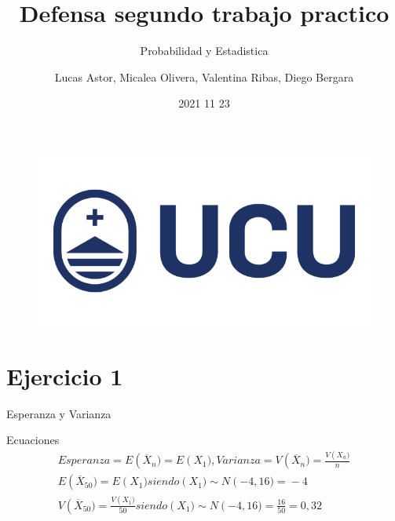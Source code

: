 \documentclass{beamer}
\author{Lucas Astor, Micalea Olivera, Valentina Ribas, Diego Bergara}
\title{Defensa segundo trabajo practico}
\subtitle{Probabilidad y Estadistica}
\institute{UNIVERSIDAD CATOLICA DEL URUGUAY}
\date{2021 11 23}
\begin{document}
\kaishu

\begin{frame}
    \titlepage
    \begin{figure}[htpb]
        \begin{center}
            \includegraphics[width=0.2\linewidth]{pic/logo.png}
        \end{center}
    \end{figure}
\end{frame}

\begin{frame}
    \tableofcontents[sectionstyle=show,subsectionstyle=show/shaded/hide,subsubsectionstyle=show/shaded/hide]
\end{frame}


\section{Ejercicio 1}


\begin{frame}{Esperanza y Varianza}
    \begin{exampleblock}{Ecuaciones}
        \begin{multline}
            Esperanza = E\left(\overline X_{n})=\right.E\left(X_{1})\right., Varianza = V\left(\overline X_{n})=\right.\frac{V\left(X_{n})\right.}{n}\label{eq:reset}\\
            E\left(\overline X_{50})=\right. E\left(X_{1}) \right. siendo \left(X_{1})\sim \right. N\left(-4, 16)=\right. -4\\
            V\left(\overline X_{50})=\right.\frac{V\left(X_{1})\right.}{50} siendo \left(X_{1})\sim \right. N\left(-4, 16)=\right. \frac{16}{50} = 0,32 \label{eq:reset}\\
        \end{multline}
    \end{exampleblock}
\end{frame}
\end{document}
